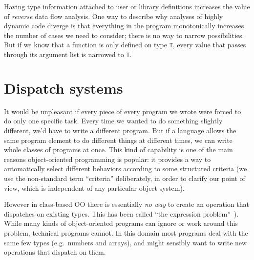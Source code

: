 Having type information attached to user or library definitions
increases the value of \emph{reverse} data flow analysis.
One way to describe why analyses of highly dynamic code diverge
is that everything in the program monotonically increases the
number of cases we need to consider; there is no way to
narrow possibilities.
But if we know that a function is only defined on type \texttt{T},
every value that passes through its argument list is narrowed to
\texttt{T}.





\section{Dispatch systems}

It would be unpleasant if every piece of every program we wrote were forced
to do only one specific task.
Every time we wanted to do something slightly different, we'd have to write
a different program.
But if a language allows the same program element to do different things at
different times, we can write whole classes of programs at once.
This kind of capability is one of the main reasons object-oriented programming
is popular: it provides a way to automatically select different behaviors
according to some structured criteria
(we use the non-standard term ``criteria'' deliberately, in order
to clarify our point of view, which is independent of any particular
object system).

However in class-based OO there is essentially \emph{no way} to create an
operation that dispatches on existing types.
This has been called ``the expression problem''~\cite{wadler1998expression}).
While many kinds of object-oriented programs can ignore or work around
this problem, technical programs cannot.
In this domain most programs deal with the same
few types (e.g.\ numbers and arrays), and might sensibly want to write new
operations that dispatch on them.

